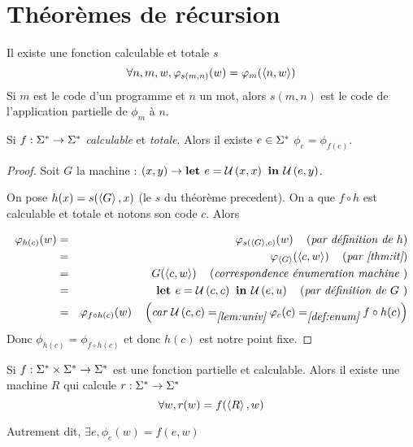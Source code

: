 \section{Théorèmes de récursion}


\begin{theorem}\label{thm:it}
	Il existe une fonction calculable et totale $s$ \tlq
	$$\forall n,m,w, \varphi_{s(m,n)}(w) = \varphi_m(\left\langle n,w\right\rangle)$$
	Si $m$ est le code d'un programme et $n$ un mot, alors $s(m,n)$ est le code de l'application partielle de $\phi_m$ à $n$.
\end{theorem}

\begin{theorem}
	Si $ f : \Sigma^{*} \to \Sigma^{*}$ \emph{calculable} et \emph {totale}. Alors il existe $e \in \Sigma^{*}$ \tq $\phi_e = \phi_{f(e)}$.
\end{theorem}


\begin{proof}
    Soit $G$ la machine : $(x,y) \to \textbf{let } e = \mathcal U \left(x,x\right) \textbf{ in } {\mathcal U \left(e,y\right)}$.

	On pose $h(x) = s(\left\langle G\right\rangle, x)$ (le $s$ du théorème precedent). On a que $f \circ h$ est calculable et totale et notons son code $c$. Alors

	\begin{eqnarray*}
		\varphi_{h(c)} (w) &=& \varphi_{s(\left\langle G\right\rangle, c)} (w) \quad\left(\textit{par définition de $h$}\right) \\
		&=& \varphi_{\left\langle G\right\rangle} (\left\langle c, w\right\rangle) \quad\left(\textit{par \ref{thm:it}}\right) \\
		&=& G (\left\langle c, w\right\rangle) \quad\left(\textit{correspondence énumeration machine }\right)\\
		&=& \textbf{let } e = \mathcal U \left(c,c\right) \textbf{ in } \mathcal U \left(e,u\right) \quad\left(\textit{par définition de $G$ }\right)\\
		&=& \varphi_{f \circ h (c)}(w) \quad\left(\textit{car $\mathcal U \left(c,c\right) =_{\ref{lem:univ}} \varphi_c(c) =_{\ref{def:enum}} f \circ h (c)$}\right)
	\end{eqnarray*}
	Donc $\phi_{h(c)} = \phi_{f \circ h (c)}$ et donc $h(c)$ est notre point fixe.
\end{proof}


\begin{theorem}[de récursion]
	Si $f : \Sigma^{*} \times \Sigma^{*} \to \Sigma^{*}$ est une fonction partielle et calculable. Alors il existe une machine $R$ qui calcule $r : \Sigma^{*} \to \Sigma^{*} $ \tq
	$$ \forall w, r(w) =  f (\left\langle R\right\rangle, w)$$

	Autrement dit, $\exists e, \phi_e (w) = f (e, w)$
\end{theorem}


